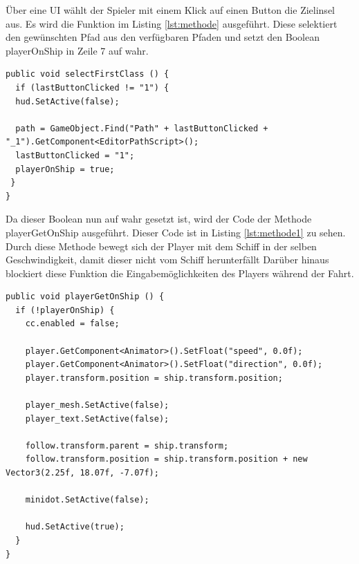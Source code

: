 			Über eine \ac{UI} wählt der Spieler mit einem Klick auf einen Button die Zielinsel aus. Es wird die Funktion im Listing \ref{lst:methode} ausgeführt. Diese selektiert den gewünschten Pfad aus den verfügbaren Pfaden und setzt den Boolean playerOnShip in Zeile 7 auf wahr. 

\begin{scriptsize}
\lstset{
	float,
	caption=Methode selectFirstClass, 
	language=[Sharp]C, 
	frame=single,  
	showstringspaces=false, 
	showspaces=false, 
	numbers=left, 
	captionpos=b, 
	belowcaptionskip=4pt,
	basicstyle=\ttfamily
} 
\begin{lstlisting}[label=lst:methode]
public void selectFirstClass () {
  if (lastButtonClicked != "1") {
  hud.SetActive(false);
  
  path = GameObject.Find("Path" + lastButtonClicked + "_1").GetComponent<EditorPathScript>();
  lastButtonClicked = "1";
  playerOnShip = true;
 }
}
\end{lstlisting}
\end{scriptsize}

			Da dieser Boolean nun auf wahr gesetzt ist, wird der Code der Methode playerGetOnShip ausgeführt. Dieser Code ist in Listing \ref{lst:methode1} zu sehen. Durch diese Methode bewegt sich der Player mit dem Schiff in der selben Geschwindigkeit, damit dieser nicht vom Schiff herunterfällt Darüber hinaus blockiert diese Funktion die Eingabemöglichkeiten des Players während der Fahrt.

\begin{scriptsize}
\lstset{
	float,
	caption=Methode playerGetOnShip, 
	language=[Sharp]C, 
	frame=single,  
	showstringspaces=false, 
	showspaces=false, 
	numbers=left, 
	captionpos=b, 
	belowcaptionskip=4pt,
	basicstyle=\ttfamily
} 
\begin{lstlisting}[label=lst:methode1]
public void playerGetOnShip () {
  if (!playerOnShip) {
    cc.enabled = false;

    player.GetComponent<Animator>().SetFloat("speed", 0.0f);
    player.GetComponent<Animator>().SetFloat("direction", 0.0f);
    player.transform.position = ship.transform.position;

    player_mesh.SetActive(false);
    player_text.SetActive(false);

    follow.transform.parent = ship.transform;
    follow.transform.position = ship.transform.position + new Vector3(2.25f, 18.07f, -7.07f);

    minidot.SetActive(false);

    hud.SetActive(true);
  }
}
\end{lstlisting}
\end{scriptsize}

